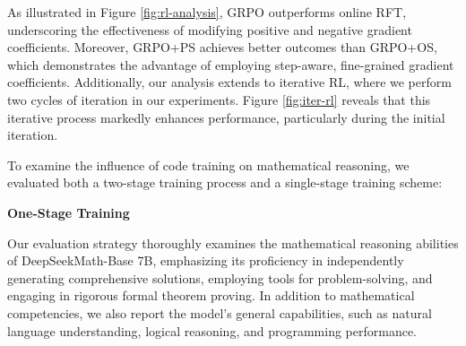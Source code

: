As illustrated in Figure \ref{fig:rl-analysis}, GRPO outperforms online RFT, underscoring the effectiveness of modifying positive and negative gradient coefficients. Moreover, GRPO+PS achieves better outcomes than GRPO+OS, which demonstrates the advantage of employing step-aware, fine-grained gradient coefficients. Additionally, our analysis extends to iterative RL, where we perform two cycles of iteration in our experiments. Figure \ref{fig:iter-rl} reveals that this iterative process markedly enhances performance, particularly during the initial iteration.

To examine the influence of code training on mathematical reasoning, we evaluated both a two-stage training process and a single-stage training scheme:


\begin{abstract}
Mathematical reasoning remains a particularly demanding task for language models, given the high degree of structure and complexity involved. This study presents DeepSeekMath~7B, developed by further pre-training DeepSeek-Coder-Base-v1.5 7B on a corpus of 120B math-centric tokens, extracted from Common Crawl along with additional natural language and programming data. Remarkably, DeepSeekMath~7B attains a score of 51.7\% on the MATH benchmark—designed to assess competition-level mathematical ability—without dependence on external toolkits or ensemble voting methods, narrowing the gap to leading proprietary models like Gemini-Ultra and GPT-4. Using self-consistency with 64 samples, DeepSeekMath~7B's score rises to 60.9\% on the same benchmark. The superior performance of DeepSeekMath~is largely attributed to two central components: (1) leveraging a substantial volume of publicly accessible web data through a rigorously constructed data filtration and selection process, and (2) the implementation of Group Relative Policy Optimization (GRPO), an adaptation of Proximal Policy Optimization (PPO), which not only strengthens mathematical reasoning but also improves the memory efficiency during PPO-based training.
\end{abstract}

\textbf{One-Stage Training}

Our evaluation strategy thoroughly examines the mathematical reasoning abilities of DeepSeekMath-Base 7B, emphasizing its proficiency in independently generating comprehensive solutions, employing tools for problem-solving, and engaging in rigorous formal theorem proving. In addition to mathematical competencies, we also report the model’s general capabilities, such as natural language understanding, logical reasoning, and programming performance.


